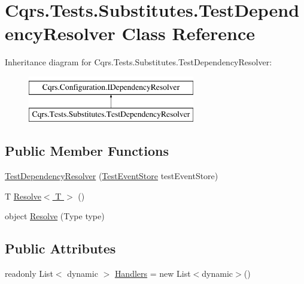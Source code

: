 \hypertarget{classCqrs_1_1Tests_1_1Substitutes_1_1TestDependencyResolver}{}\section{Cqrs.\+Tests.\+Substitutes.\+Test\+Dependency\+Resolver Class Reference}
\label{classCqrs_1_1Tests_1_1Substitutes_1_1TestDependencyResolver}
Inheritance diagram for Cqrs.\+Tests.\+Substitutes.\+Test\+Dependency\+Resolver\+:\begin{figure}[H]
\begin{center}
\leavevmode
\includegraphics[height=2.000000cm]{classCqrs_1_1Tests_1_1Substitutes_1_1TestDependencyResolver}
\end{center}
\end{figure}
\subsection*{Public Member Functions}
\begin{DoxyCompactItemize}
\item 
\hyperlink{classCqrs_1_1Tests_1_1Substitutes_1_1TestDependencyResolver_ab0ecd39381883a73869c061bc60ebff8_ab0ecd39381883a73869c061bc60ebff8}{Test\+Dependency\+Resolver} (\hyperlink{classCqrs_1_1Tests_1_1Substitutes_1_1TestEventStore}{Test\+Event\+Store} test\+Event\+Store)
\item 
T \hyperlink{classCqrs_1_1Tests_1_1Substitutes_1_1TestDependencyResolver_a67090a882241fa6a881d49c91c95cad7_a67090a882241fa6a881d49c91c95cad7}{Resolve$<$ T $>$} ()
\item 
object \hyperlink{classCqrs_1_1Tests_1_1Substitutes_1_1TestDependencyResolver_a05767824475ea6affbf6f70cf5b1fd06_a05767824475ea6affbf6f70cf5b1fd06}{Resolve} (Type type)
\end{DoxyCompactItemize}
\subsection*{Public Attributes}
\begin{DoxyCompactItemize}
\item 
readonly List$<$ dynamic $>$ \hyperlink{classCqrs_1_1Tests_1_1Substitutes_1_1TestDependencyResolver_a6fd9194240dd3d95fec9ba3788ac67e4_a6fd9194240dd3d95fec9ba3788ac67e4}{Handlers} = new List$<$dynamic$>$()
\end{DoxyCompactItemize}
